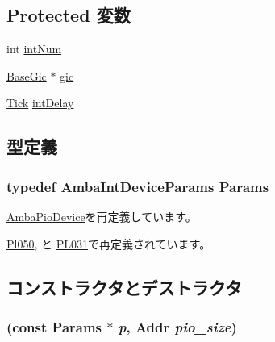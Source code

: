 \subsection*{Protected 変数}
\begin{DoxyCompactItemize}
\item 
int \hyperlink{classAmbaIntDevice_a9bd4d49b818d8cf1a6dee0576d2ff039}{intNum}
\item 
\hyperlink{classBaseGic}{BaseGic} $\ast$ \hyperlink{classAmbaIntDevice_a2e2266dca56928f63667e994933169ee}{gic}
\item 
\hyperlink{base_2types_8hh_a5c8ed81b7d238c9083e1037ba6d61643}{Tick} \hyperlink{classAmbaIntDevice_a0dad0b6dbada03eb5daf9c1ed859d62e}{intDelay}
\end{DoxyCompactItemize}


\subsection{型定義}
\hypertarget{classAmbaIntDevice_aa70660260d212b343768d91a298c80de}{
\subsubsection[{Params}]{\setlength{\rightskip}{0pt plus 5cm}typedef AmbaIntDeviceParams {\bf Params}}}
\label{classAmbaIntDevice_aa70660260d212b343768d91a298c80de}


\hyperlink{classAmbaPioDevice_ab091a3a8ffa1f3152ec35e30d1b384d5}{AmbaPioDevice}を再定義しています。

\hyperlink{classPl050_a12cd0d18c639c998ce04efabfca4d619}{Pl050}, と \hyperlink{classPL031_acd44fa02a8cc03d321b406d70faea0d8}{PL031}で再定義されています。

\subsection{コンストラクタとデストラクタ}
\hypertarget{classAmbaIntDevice_adef94b04b9c62ec3a1f26f4d201cbaf5}{
\subsubsection[{AmbaIntDevice}]{ (const {\bf Params} $\ast$ {\em p}, \/  {\bf Addr} {\em pio\_\-size})}}
\label{classAmbaIntDevice_adef94b04b9c62ec3a1f26f4d201cbaf5}



